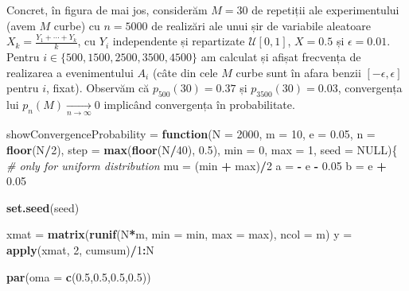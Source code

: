 \documentclass[]{article}
\newenvironment{Shaded}{\begin{snugshade}}{\end{snugshade}}
\newcommand{\KeywordTok}[1]{\textcolor[rgb]{0.13,0.29,0.53}{\textbf{#1}}}
\newcommand{\DataTypeTok}[1]{\textcolor[rgb]{0.13,0.29,0.53}{#1}}
\newcommand{\DecValTok}[1]{\textcolor[rgb]{0.00,0.00,0.81}{#1}}
\newcommand{\FloatTok}[1]{\textcolor[rgb]{0.00,0.00,0.81}{#1}}
\newcommand{\StringTok}[1]{\textcolor[rgb]{0.31,0.60,0.02}{#1}}
\newcommand{\CommentTok}[1]{\textcolor[rgb]{0.56,0.35,0.01}{\textit{#1}}}
\newcommand{\OtherTok}[1]{\textcolor[rgb]{0.56,0.35,0.01}{#1}}
\newcommand{\ControlFlowTok}[1]{\textcolor[rgb]{0.13,0.29,0.53}{\textbf{#1}}}
\newcommand{\OperatorTok}[1]{\textcolor[rgb]{0.81,0.36,0.00}{\textbf{#1}}}
\newcommand{\NormalTok}[1]{#1}
\begin{document}
Concret, în figura de mai jos, considerăm \(M = 30\) de repetiții ale
experimentului (avem \(M\) curbe) cu \(n = 5000\) de realizări ale unui
șir de variabile aleatoare \(X_k = \frac{Y_1+\cdots+Y_k}{k}\), cu
\(Y_i\) independente și repartizate \(\mathcal{U}[0,1]\), \(X = 0.5\) și
\(\epsilon = 0.01\). Pentru \(i\in\{500, 1500, 2500, 3500, 4500\}\) am
calculat și afișat frecvența de realizarea a evenimentului \(A_i\) (câte
din cele \(M\) curbe sunt în afara benzii \([-\epsilon, \epsilon]\)
pentru \(i\), fixat). Observăm că \(p_{500}(30) = 0.37\) și
\(p_{3500}(30) = 0.03\), convergența lui
\(p_n(M)\underset{n\to \infty}{\longrightarrow} 0\) implicând
convergența în probabilitate.

\begin{Shaded}
\begin{Highlighting}[]
\NormalTok{showConvergenceProbability =}\StringTok{ }\ControlFlowTok{function}\NormalTok{(}\DataTypeTok{N =} \DecValTok{2000}\NormalTok{, }\DataTypeTok{m =} \DecValTok{10}\NormalTok{, }\DataTypeTok{e =} \FloatTok{0.05}\NormalTok{, }\DataTypeTok{n =} \KeywordTok{floor}\NormalTok{(N}\OperatorTok{/}\DecValTok{2}\NormalTok{), }
                                      \DataTypeTok{step =} \KeywordTok{max}\NormalTok{(}\KeywordTok{floor}\NormalTok{(N}\OperatorTok{/}\DecValTok{40}\NormalTok{), }\FloatTok{0.5}\NormalTok{), }\DataTypeTok{min =} \DecValTok{0}\NormalTok{, }\DataTypeTok{max =} \DecValTok{1}\NormalTok{,}
                                      \DataTypeTok{seed =} \OtherTok{NULL}\NormalTok{)\{}
  \CommentTok{# only for uniform distribution }
\NormalTok{  mu =}\StringTok{ }\NormalTok{(min }\OperatorTok{+}\StringTok{ }\NormalTok{max)}\OperatorTok{/}\DecValTok{2}
\NormalTok{  a =}\StringTok{ }\OperatorTok{-}\StringTok{ }\NormalTok{e }\OperatorTok{-}\StringTok{ }\FloatTok{0.05}
\NormalTok{  b =}\StringTok{ }\NormalTok{e }\OperatorTok{+}\StringTok{ }\FloatTok{0.05}
  
  \KeywordTok{set.seed}\NormalTok{(seed)}
  
\NormalTok{  xmat =}\StringTok{ }\KeywordTok{matrix}\NormalTok{(}\KeywordTok{runif}\NormalTok{(N}\OperatorTok{*}\NormalTok{m, }\DataTypeTok{min =}\NormalTok{ min, }\DataTypeTok{max =}\NormalTok{ max), }\DataTypeTok{ncol =}\NormalTok{ m)}
\NormalTok{  y =}\StringTok{ }\KeywordTok{apply}\NormalTok{(xmat, }\DecValTok{2}\NormalTok{, cumsum)}\OperatorTok{/}\DecValTok{1}\OperatorTok{:}\NormalTok{N}
  
  
  \KeywordTok{par}\NormalTok{(}\DataTypeTok{oma =} \KeywordTok{c}\NormalTok{(}\FloatTok{0.5}\NormalTok{,}\FloatTok{0.5}\NormalTok{,}\FloatTok{0.5}\NormalTok{,}\FloatTok{0.5}\NormalTok{))}
  

\end{Highlighting}
\end{Shaded}
\end{document}

